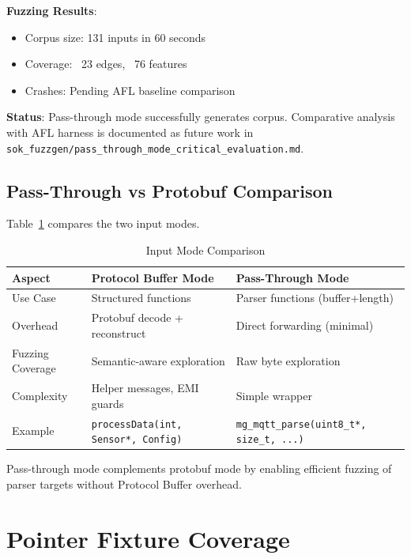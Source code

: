 \documentclass[doublespace,nopageskip]{VTthesis}
\begin{document}
\textbf{Fuzzing Results}:
\begin{itemize}
    \item Corpus size: 131 inputs in 60 seconds
    \item Coverage: ~23 edges, ~76 features
    \item Crashes: Pending AFL baseline comparison
\end{itemize}

\textbf{Status}: Pass-through mode successfully generates corpus. Comparative analysis with AFL harness is documented as future work in \texttt{sok\_fuzzgen/pass\_through\_mode\_critical\_evaluation.md}.

\subsection{Pass-Through vs Protobuf Comparison}

Table~\ref{tab:mode_comparison} compares the two input modes.

\begin{table}[htb]
    \centering
    \caption{Input Mode Comparison}
    \begin{tabularx}{\textwidth}{>{\raggedright\arraybackslash}p{3cm} >{\raggedright\arraybackslash}X >{\raggedright\arraybackslash}X}
        \toprule
        Aspect & Protocol Buffer Mode & Pass-Through Mode \\
        \midrule
        Use Case & Structured functions & Parser functions (buffer+length) \\
        Overhead & Protobuf decode + reconstruct & Direct forwarding (minimal) \\
        Fuzzing Coverage & Semantic-aware exploration & Raw byte exploration \\
        Complexity & Helper messages, EMI guards & Simple wrapper \\
        Example & \texttt{processData(int, Sensor*, Config)} & \texttt{mg\_mqtt\_parse(uint8\_t*, size\_t, ...)} \\
        \bottomrule
    \end{tabularx}
    \label{tab:mode_comparison}
\end{table}

Pass-through mode complements protobuf mode by enabling efficient fuzzing of parser targets without Protocol Buffer overhead.

\section{Pointer Fixture Coverage} \label{se:pointer_fixture_coverage}
\end{document}
